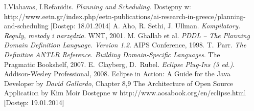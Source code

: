 \begin{thebibliography}{1}
 I.Vlahavas, I.Refanidis. \emph{Planning and Scheduling.} Dostępny w: http://www.eetn.gr/index.php/eetn-publications/ai-research-in-greece/planning-and-scheduling [Dostęp: 18.01.2014]
A. Aho, R. Sethi, J. Ullman. \emph{Kompilatory. Reguły, metody i narzędzia}.
WNT, 2001.
M. Ghallab et al. \emph{PDDL -- The Planning Domain Definition Language. Version 1.2}.
AIPS Conference, 1998.
T.~Parr. \emph{The Definitive ANTLR Reference. Building Domain-Specific Languages}. 
The Pragmatic Bookshelf, 2007.
E.~Clayberg, D.~Rubel. \emph{Eclipse Plug-Ins (3 ed.)}. Addison-Wesley Professional, 2008. 
Eclipse in Action: A Guide for the Java Developer by \emph{David Gallardo}, Chapter 8,9
 The Architecture of Open Source Application by Kim Moir Dostępne w http://www.aosabook.org/en/eclipse.html [Dostęp: 19.01.2014]
\end{thebibliography}

